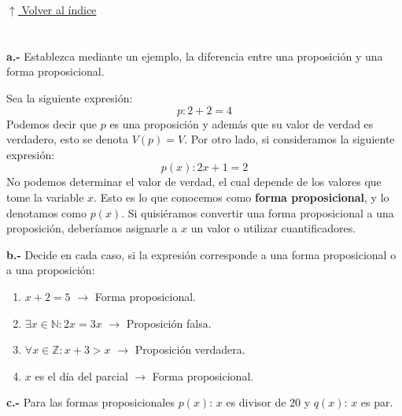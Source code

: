 \documentclass[12pt]{article}
\newcommand{\volverindice}{%
    \vspace{1em}%
    \begin{flushright}%
        \hyperlink{indice}{\small $\uparrow$ Volver al índice}%
    \end{flushright}%
}
\begin{document}
\volverindice
\newpage


\section[Proposiciones y formas proposicionales]{}

\textbf{a.-} Establezca mediante un ejemplo, la diferencia entre una proposición y una forma proposicional.

Sea la siguiente expresión:
\[p: 2 + 2 = 4\]
Podemos decir que $p$ es una proposición y además que su valor de verdad es verdadero, esto se denota $V(p) = V$. Por otro lado, si consideramos la siguiente expresión:
\[p(x): 2x + 1 = 2\]
No podemos determinar el valor de verdad, el cual depende de los valores que tome la variable $x$. Esto es lo que conocemos como \textbf{forma proposicional}, y lo denotamos como $p(x)$. Si quisiéramos convertir una forma proposicional a una proposición, deberíamos asignarle a $x$ un valor o utilizar cuantificadores.

\textbf{b.-} Decide en cada caso, si la expresión corresponde a una forma proposicional o a una proposición:

\begin{enumerate}[label=\roman*)]
    \item $x + 2 = 5$ $\rightarrow$ Forma proposicional.
    \item $\exists x \in \mathbb{N}: 2x = 3x$ $\rightarrow$ Proposición falsa.
    \item $\forall x \in \mathbb{Z}: x + 3 > x$ $\rightarrow$ Proposición verdadera.
    \item $x$ es el día del parcial $\rightarrow$ Forma proposicional.
\end{enumerate}

\textbf{c.-} Para las formas proposicionales $p(x)$: $x$ es divisor de 20 \quad y \quad $q(x)$: $x$ es par.
\end{document}
